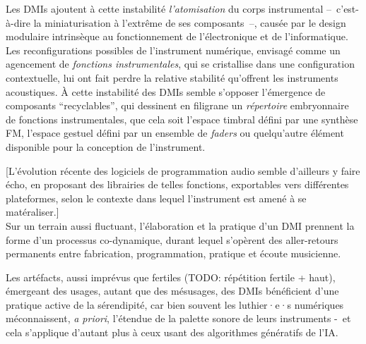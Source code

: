 Les \glspl{DMI} ajoutent à cette instabilité \textit{l'atomisation} du corps instrumental --~c'est-à-dire la miniaturisation à l'extrême de ses composants~--, causée par le design modulaire intrinsèque au fonctionnement de l'électronique et de l'informatique. Les reconfigurations possibles de l'instrument numérique, envisagé comme un agencement de \textit{fonctions instrumentales}, qui se cristallise dans une configuration contextuelle, lui ont fait perdre la relative stabilité qu'offrent les instruments acoustiques. À cette instabilité des \glspl{DMI} semble s'opposer l'émergence de composants ``recyclables'', qui dessinent en filigrane un \textit{répertoire} embryonnaire de fonctions instrumentales, que cela soit l'espace timbral défini par une synthèse FM, l'espace gestuel défini par un ensemble de \textit{faders} ou quelqu'autre élément disponible pour la conception de l'instrument.

[L'évolution récente des logiciels de programmation audio semble d'ailleurs y faire écho, en proposant des librairies de telles fonctions, exportables vers différentes plateformes, selon le contexte dans lequel l'instrument est amené à se matéraliser.]\\
\indent Sur un terrain aussi fluctuant, l'élaboration et la pratique d'un \gls{DMI} prennent la forme d'un processus co-dynamique, durant lequel s'opèrent des aller-retours permanents entre fabrication, programmation, pratique et écoute musicienne.

Les artéfacts, aussi imprévus que fertiles (TODO: répétition fertile + haut), émergeant des usages, autant que des mésusages, des \glspl{DMI} bénéficient d'une pratique active de la sérendipité, car bien souvent les luthier·e·s numériques méconnaissent, \textit{a priori}, l'étendue de la palette sonore de leurs instruments -~et cela s'applique d'autant plus à ceux usant des algorithmes génératifs de l'IA.

